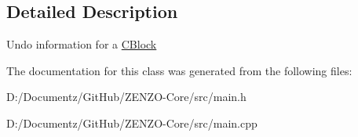\subsection{Detailed Description}
Undo information for a \mbox{\hyperlink{class_c_block}{C\+Block}} 

The documentation for this class was generated from the following files\+:\begin{DoxyCompactItemize}
\item 
D\+:/\+Documentz/\+Git\+Hub/\+Z\+E\+N\+Z\+O-\/\+Core/src/main.\+h\item 
D\+:/\+Documentz/\+Git\+Hub/\+Z\+E\+N\+Z\+O-\/\+Core/src/main.\+cpp\end{DoxyCompactItemize}
